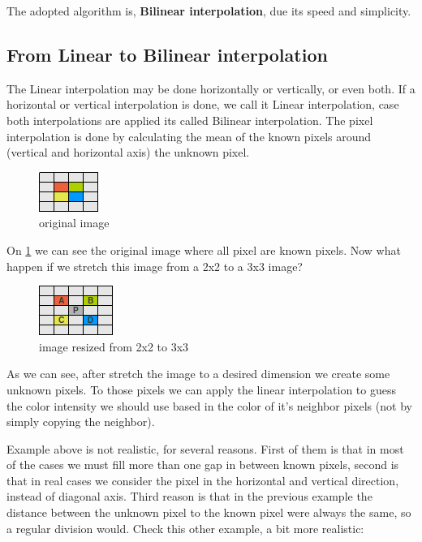 \documentclass{article}
\begin{document}
	The adopted algorithm is, \textbf{Bilinear interpolation},  due its speed and simplicity.
	
\subsection{From Linear to Bilinear interpolation}

	The Linear interpolation may be done horizontally or vertically, or even both. If a horizontal or vertical interpolation is done, we call it
	Linear interpolation, case both interpolations are applied its called Bilinear interpolation.	
	The pixel interpolation is done by calculating the mean of the known pixels around (vertical and horizontal axis) the unknown pixel. 


	\begin{figure} [H]
		\centering
		\includegraphics[scale=1]{images/bilinear_interpolation_1}
		\caption{original image \label{bilinear1}}
	\end{figure}

	On \ref{bilinear1} we can see the original image where all pixel are known pixels. Now what happen if we stretch this image 
	from a 2x2 to a 3x3 image?
	
	\begin{figure} [H]
		\centering
		\includegraphics[scale=1]{images/bilinear_interpolation_2}
		\caption{image resized from 2x2 to 3x3 \label{bilinear2}}
	\end{figure}

	As we can see, after stretch the image to a desired dimension we create some unknown pixels. To those pixels we can apply the linear interpolation 
	to guess the color intensity we should use based in the color of it's neighbor pixels (not by simply copying the neighbor).

	Example above is not realistic, for several reasons. First of them is that in most of the cases we must fill more than one gap in between known pixels,
	second is that in real cases we consider the pixel in the horizontal and vertical direction, instead of diagonal axis. Third reason is that in the 
	previous example the distance between the unknown pixel to the known pixel were always the same, so a regular division would. 
	Check this other example, a bit more realistic:
	
\end{document}
